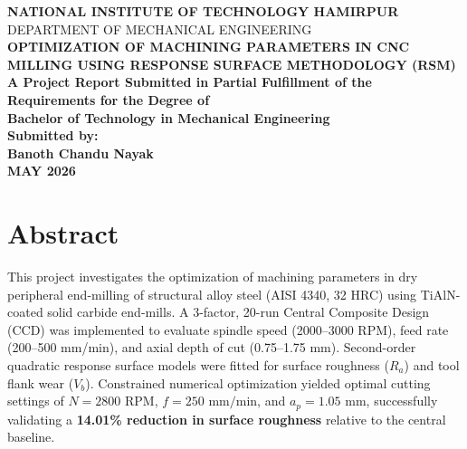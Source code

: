 \documentclass[12pt,a4paper]{report}
\begin{document}
\begin{titlepage}
    \centering
    \vspace*{0.5cm}
    {\Large \textbf{NATIONAL INSTITUTE OF TECHNOLOGY HAMIRPUR}}\\[0.3cm]
    {\large DEPARTMENT OF MECHANICAL ENGINEERING}\\[2.0cm]
    {\LARGE \textbf{OPTIMIZATION OF MACHINING PARAMETERS IN CNC MILLING USING RESPONSE SURFACE METHODOLOGY (RSM)}}\\[2.5cm]
    \textbf{A Project Report Submitted in Partial Fulfillment of the Requirements for the Degree of}\\[0.3cm]
    \textbf{Bachelor of Technology in Mechanical Engineering}\\[2.0cm]
    \textbf{Submitted by:}\\[0.2cm]
    \textbf{Banoth Chandu Nayak}\\[3.0cm]
    \textbf{MAY 2026}
\end{titlepage}

\chapter*{Abstract}
This project investigates the optimization of machining parameters in dry peripheral end-milling of structural alloy steel (AISI 4340, 32 HRC) using TiAlN-coated solid carbide end-mills. A 3-factor, 20-run Central Composite Design (CCD) was implemented to evaluate spindle speed (2000--3000 RPM), feed rate (200--500 mm/min), and axial depth of cut (0.75--1.75 mm). Second-order quadratic response surface models were fitted for surface roughness ($R_a$) and tool flank wear ($V_b$). Constrained numerical optimization yielded optimal cutting settings of $N = 2800\text{ RPM}$, $f = 250\text{ mm/min}$, and $a_p = 1.05\text{ mm}$, successfully validating a \textbf{14.01\% reduction in surface roughness} relative to the central baseline.
\end{document}
